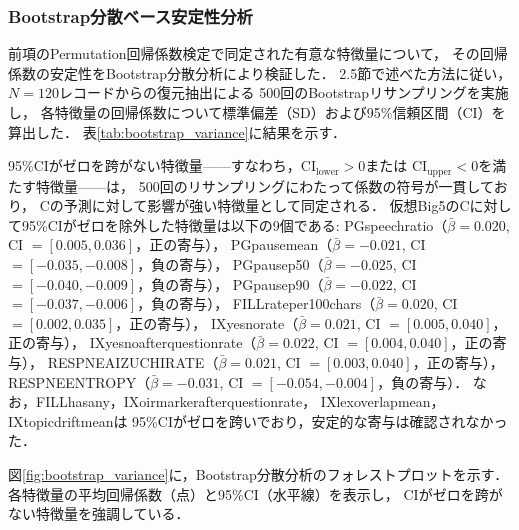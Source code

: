 \documentclass[dvipdfmx,11pt,a4paper]{bxjsarticle}
\renewcommand{\_}{\paperorigunderscore\allowbreak}%
\begin{document}
\subsubsection{Bootstrap分散ベース安定性分析}
\label{sec:result_bootstrap_variance}

前項のPermutation回帰係数検定で同定された有意な特徴量について，
その回帰係数の安定性をBootstrap分散分析により検証した．
2.5節で述べた方法に従い，$N = 120$レコードからの復元抽出による
500回のBootstrapリサンプリングを実施し，
各特徴量の回帰係数について標準偏差（SD）および95\%信頼区間（CI）を算出した．
表\ref{tab:bootstrap_variance}に結果を示す．

\begin{table}[htbp]
\centering
\caption{Bootstrap分散ベース安定性分析結果（仮想Big5, C, 500回リサンプリング）．
各特徴量の平均回帰係数，SD，95\%CI（2.5--97.5パーセンタイル），
およびCIがゼロを除外するか（$\checkmark$: 影響が強い特徴量）を示す．}
\label{tab:bootstrap_variance}

\end{table}

95\%CIがゼロを跨がない特徴量——すなわち，$\text{CI}_{\text{lower}} > 0$または
$\text{CI}_{\text{upper}} < 0$を満たす特徴量——は，
500回のリサンプリングにわたって係数の符号が一貫しており，
Cの予測に対して影響が強い特徴量として同定される．
仮想Big5のCに対して95\%CIがゼロを除外した特徴量は以下の9個である:
PG\_speech\_ratio（$\bar{\beta} = 0.020$, CI $= [0.005, 0.036]$，正の寄与），
PG\_pause\_mean（$\bar{\beta} = -0.021$, CI $= [-0.035, -0.008]$，負の寄与），
PG\_pause\_p50（$\bar{\beta} = -0.025$, CI $= [-0.040, -0.009]$，負の寄与），
PG\_pause\_p90（$\bar{\beta} = -0.022$, CI $= [-0.037, -0.006]$，負の寄与），
FILL\_rate\_per\_100chars（$\bar{\beta} = 0.020$, CI $= [0.002, 0.035]$，正の寄与），
IX\_yesno\_rate（$\bar{\beta} = 0.021$, CI $= [0.005, 0.040]$，正の寄与），
IX\_yesno\_after\_question\_rate（$\bar{\beta} = 0.022$, CI $= [0.004, 0.040]$，正の寄与），
RESP\_NE\_AIZUCHI\_RATE（$\bar{\beta} = 0.021$, CI $= [0.003, 0.040]$，正の寄与），
RESP\_NE\_ENTROPY（$\bar{\beta} = -0.031$, CI $= [-0.054, -0.004]$，負の寄与）．
なお，FILL\_has\_any，IX\_oirmarker\_after\_question\_rate，
IX\_lex\_overlap\_mean，IX\_topic\_drift\_meanは
95\%CIがゼロを跨いでおり，安定的な寄与は確認されなかった．

図\ref{fig:bootstrap_variance}に，Bootstrap分散分析のフォレストプロットを示す．
各特徴量の平均回帰係数（点）と95\%CI（水平線）を表示し，
CIがゼロを跨がない特徴量を強調している．
\end{document}
